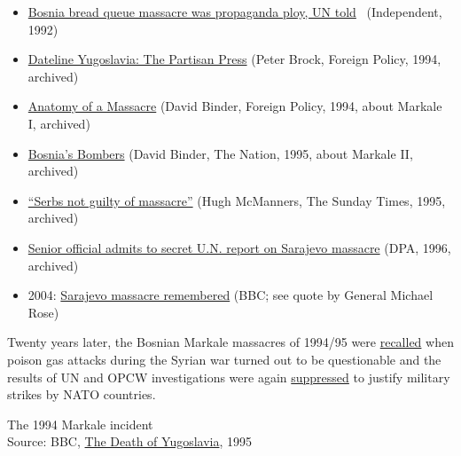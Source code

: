 \begin{itemize}
\tightlist
\item
  \href{https://www.independent.co.uk/news/muslims-slaughter-their-own-people-bosnia-bread-queue-massacre-was-propaganda-ploy-un-told-1541801.html}{Bosnia
  bread queue massacre was propaganda ploy, UN told}~ (Independent,
  1992)
\item
  \href{https://swprs.files.wordpress.com/2019/12/dateline-yugoslavia-the-partisan-press_peter-brock_foreign-policy_1994.pdf}{Dateline
  Yugoslavia: The Partisan Press} (Peter Brock, Foreign Policy, 1994,
  archived)
\item
  \href{https://swprs.files.wordpress.com/2019/12/anatomy-of-a-massacre_david-binder_foreign-policy_1994.pdf}{Anatomy
  of a Massacre} (David Binder, Foreign Policy, 1994, about Markale I,
  archived)
\item
  \href{https://swprs.files.wordpress.com/2019/12/bosnias-bombers_david-binder_the-nation-1995.pdf}{Bosnia's
  Bombers} (David Binder, The Nation, 1995, about Markale II, archived)
\item
  \href{https://swprs.files.wordpress.com/2019/12/sunday-times_serbs-not-guilty-of-massacre_1995.pdf}{``Serbs
  not guilty of massacre''} (Hugh McManners, The Sunday Times, 1995,
  archived)
\item
  \href{https://swprs.files.wordpress.com/2019/12/dpa_un-report-sarajevo_1996.pdf}{Senior
  official admits to secret U.N. report on Sarajevo massacre} (DPA,
  1996, archived)
\item
  2004: \href{http://news.bbc.co.uk/2/hi/europe/3459965.stm}{Sarajevo
  massacre remembered} (BBC; see quote by General Michael Rose)
\end{itemize}

Twenty years later, the Bosnian Markale massacres of 1994/95 were
\href{https://swprs.files.wordpress.com/2019/12/sarajevo-1995-damscus-2013-mass-attack-deceptions_world-tribune.pdf}{recalled}
when poison gas attacks during the Syrian war turned out to be
questionable and the results of UN and OPCW investigations were again
\href{https://www.dailymail.co.uk/news/article-7793253/PETER-HITCHENS-reveals-evidence-watchdog-suppressed-report-casting-doubt-Assad-gas-attack.html}{suppressed}
to justify military strikes by NATO countries.

The 1994 Markale incident\\
Source: BBC,
\href{https://www.youtube.com/playlist?list=PLJvRFxihL4d03IzmoxyhU1C-kn27lxVvB}{The
Death of Yugoslavia}, 1995

